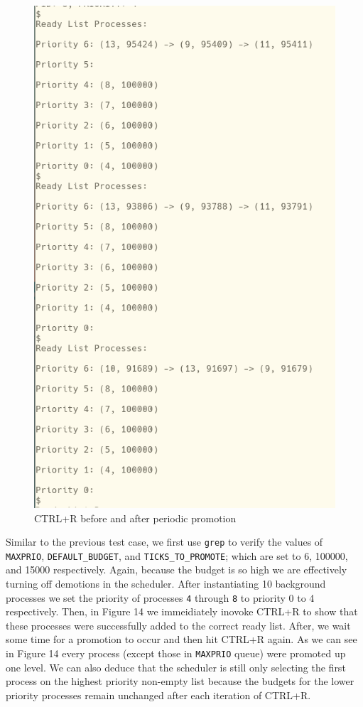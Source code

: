 \documentclass[11pt,letterpaper]{report}
\newcommand{\code}[1]{\colorbox{codegray}{\texttt{#1}}}
\begin{document}
{  \begin{figure}[h!]
	\centering
	\includegraphics[scale=.75]{maxprio-6-lists2.png}
	\caption[img]{CTRL+R before and after periodic promotion}
	\label{fig:P1compileP0-1}
  \end{figure}

  \pagebreak

  Similar to the previous test case, we first use \code{grep} to verify the values of \code{MAXPRIO}, 
  \code{DEFAULT\_BUDGET}, and \code{TICKS\_TO\_PROMOTE}; which are set to 6, 100000, and 15000
  respectively. Again, because the budget is so high we are effectively turning off demotions
  in the scheduler. After instantiating 10 background processes we set the priority of processes 
  \code{4} through \code{8} to priority 0 to 4 respectively. Then, in Figure 14 we immeidiately 
  inovoke CTRL+R to show that these processes were successfully added to the correct ready list. 
  After, we wait some time for a promotion to occur and then hit CTRL+R again. As we can see in 
  Figure 14 every process (except those in \code{MAXPRIO} queue) were promoted up one level. We 
  can also deduce that the scheduler is still only selecting the first process on the highest priority
  non-empty list because the budgets for the lower priority processes remain unchanged after each
  iteration of CTRL+R. 

}
\end{document}
